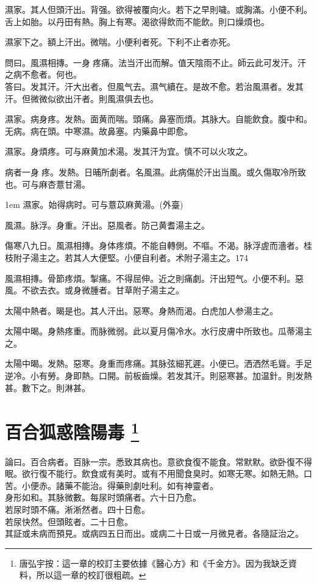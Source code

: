 濕家。其人但頭汗出。背强。欲得被覆向火。若下之早則噦。{\khaaitp 或}胸滿。小便{\khaaitp 不}利。舌上如胎。以丹田有熱。胸上有寒。渴欲得飲而不能飲。則口燥{\khaaitp 煩}也。

濕家下之。額上汗出。微喘。小便利者死。下利不止者亦死。

問曰。風濕相摶。一身{\sungtpii 𥁞}疼痛。法当汗出而解。值天陰雨不止。師云此可发汗。汗之病不愈者。何也。\\
答曰。发其汗。汗大出者。但風气去。濕气續在。是故不愈。若治風濕者。发其汗。但微微似欲出汗者。則風濕俱去也。

濕家。病身疼。发熱。面黄而喘。頭痛。鼻塞而煩。其脉大。自能飲食。腹中和。无病。病在頭。中寒濕。故鼻塞。内藥鼻中即愈。

濕家。身煩疼。可与麻黄加术湯。发其汗为宜。慎不可以火攻之。

病者一身{\sungtpii 𥁞}疼。发熱。日晡所劇者。名風濕。此病傷於汗出当風。或久傷取冷所致也。可与麻杏薏甘湯。

\hangindent 1em
濕家。始得病时。可与薏苡麻黄湯。(外臺)

風濕。脉浮。身重。汗出。惡風者。防己黄耆湯主之。

傷寒八九日。風濕相摶。身体疼煩。不能自轉側。不嘔。不渴。脉浮虗而濇者。桂枝附子湯主之。若其人大便堅。小便自利者。术附子湯主之。174

風濕相摶。骨節疼煩。掣痛。不得屈伸。近之則痛劇。汗出短气。小便不利。惡風。不欲去衣。或身微腫者。甘草附子湯主之。

太陽中熱者。暍是也。其人汗出。惡寒。身熱而渴。白虎{\khaaitp 加人参}湯主之。

太陽中暍。身熱疼重。而脉微弱。此以夏月傷冷水。水行皮膚中所致也。瓜蒂湯主之。

太陽中暍。发熱。惡寒。身重而疼痛。其脉弦細芤遲。小便已。洒洒然毛聳。手足逆冷。小有勞。身即熱。口開。前板齒燥。若发其汗。則惡寒甚。加温針。則发熱甚。數下之。則淋甚。

\chapter{百合狐惑陰陽毒
	{
		\footnote{
			唐弘宇按：這一章的校訂主要依據《醫心方》和《千金方》。因为我缺乏資料，所以這一章的校訂很粗疏。
		}
	}
}

論曰。百合病者。百脉一宗。悉致其病也。意欲食復不能食。常默默。欲卧{\khaaitp 復}不得眠。欲行{\khaaitp 復}不能行。飲食或有美时。或有不用聞食臭时。如寒无寒。如熱无熱。口苦。小便赤。諸藥不能治。得藥則劇吐利。如有神靈者。\\
身形如和。其脉微數。每尿时頭痛者。六十日乃愈。\\
若尿时頭不痛。淅{\khaaitp 淅}然者。四十日愈。\\
若尿快然。但頭眩者。二十日愈。\\
其証或未病而預見。或病四五日而出。或病二十日或一月微見者。各隨証治之。

